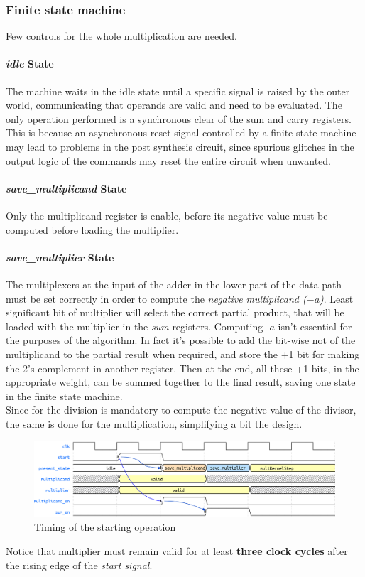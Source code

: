 \subsubsection{Finite state machine}
Few controls for the whole multiplication are needed.
\paragraph{\textit{idle} State}
The machine waits in the idle state until a specific signal is raised by the outer world, communicating that operands are valid and need to be evaluated. The only operation performed is a synchronous clear of the sum and carry registers. This is because an asynchronous reset signal controlled by a finite state machine may lead to problems in the post synthesis circuit, since spurious glitches in the output logic of the commands may reset the entire circuit when unwanted.
\paragraph{\textit{save\_multiplicand} State}
Only the multiplicand register is enable, before its negative value must be computed before loading the multiplier.
\paragraph{\textit{save\_multiplier} State}
The multiplexers at the input of the adder in the lower part of the data path must be set correctly in order to compute the \textit{negative multiplicand ($-a$)}. Least significant bit of multiplier will select the correct partial product, that will be loaded with the multiplier in the \textit{sum} registers.
Computing $\textit{-a}$ isn't essential for the purposes of the algorithm. In fact it's possible to add the bit-wise not of the multiplicand to the partial result when required, and store the +1 bit for making the 2's complement in another register. Then at the end, all these +1 bits, in the appropriate weight, can be summed together to the final result, saving one state in the finite state machine.\\
Since for the division is mandatory to compute the negative value of the divisor, the same is done for the multiplication, simplifying a bit the design.\\
\begin{figure}[H]
    \centering
    \includegraphics[scale=0.7]{pics/multStart_wave.png}
    \caption{Timing of the starting operation}
    \label{fig:my_label}
\end{figure}
Notice that multiplier must remain valid for at least \textbf{three clock cycles} after the rising edge of the \textit{start signal}.
